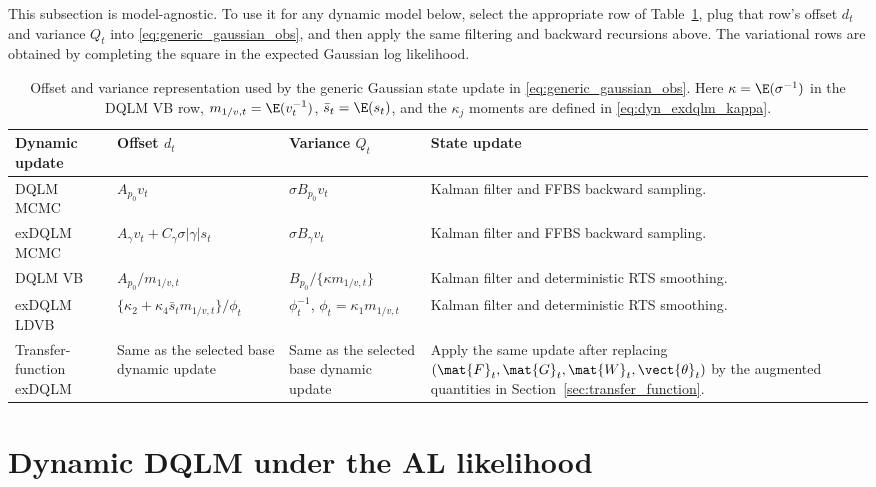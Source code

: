 This subsection is model-agnostic. To use it for any dynamic model below,
select the appropriate row of Table~\ref{tab:gaussian_state_update_map}, plug
that row's offset $d_t$ and variance $Q_t$ into
\eqref{eq:generic_gaussian_obs}, and then apply the same filtering and backward
recursions above. The variational rows are obtained by completing the square in
the expected Gaussian log likelihood.
\begin{table}[!htb]
\centering
\begingroup
\TableStyle
\begin{tabularx}{\textwidth}{@{}>{\raggedright\arraybackslash}p{}
>{\raggedright\arraybackslash}p{}
>{\raggedright\arraybackslash}p{}
>{\raggedright\arraybackslash}X@{}}
\toprule
Dynamic update & Offset $d_t$ & Variance $Q_t$ & State update \\
\midrule
DQLM MCMC &
$A_{p_0}v_t$ &
$\sigma B_{p_0}v_t$ &
Kalman filter and FFBS backward sampling. \\
exDQLM MCMC &
$A_\gamma v_t+C_\gamma\sigma|\gamma|s_t$ &
$\sigma B_\gamma v_t$ &
Kalman filter and FFBS backward sampling. \\
DQLM VB &
$A_{p_0}/m_{1/v,t}$ &
$B_{p_0}/\{\kappa m_{1/v,t}\}$ &
Kalman filter and deterministic RTS smoothing. \\
exDQLM LDVB &
$\{\kappa_2+\kappa_4\bar s_t m_{1/v,t}\}/\phi_t$ &
$\phi_t^{-1}$, $\phi_t=\kappa_1m_{1/v,t}$ &
Kalman filter and deterministic RTS smoothing. \\
Transfer-function exDQLM &
Same as the selected base dynamic update &
Same as the selected base dynamic update &
Apply the same update after replacing
$(\mat{F}_t,\mat{G}_t,\mat{W}_t,\vect{\theta}_t)$ by the augmented quantities
in Section~\ref{sec:transfer_function}. \\
\bottomrule
\end{tabularx}
\endgroup
\caption{Offset and variance representation used by the generic Gaussian state
update in \eqref{eq:generic_gaussian_obs}. Here
$\kappa=\E(\sigma^{-1})$ in the DQLM VB row,
$m_{1/v,t}=\E(v_t^{-1})$, $\bar s_t=\E(s_t)$, and the $\kappa_j$ moments are
defined in \eqref{eq:dyn_exdqlm_kappa}.}
\label{tab:gaussian_state_update_map}
\end{table}
\FloatBarrier

\section{Dynamic DQLM under the AL likelihood}
\label{sec:dyn_dqlm}

